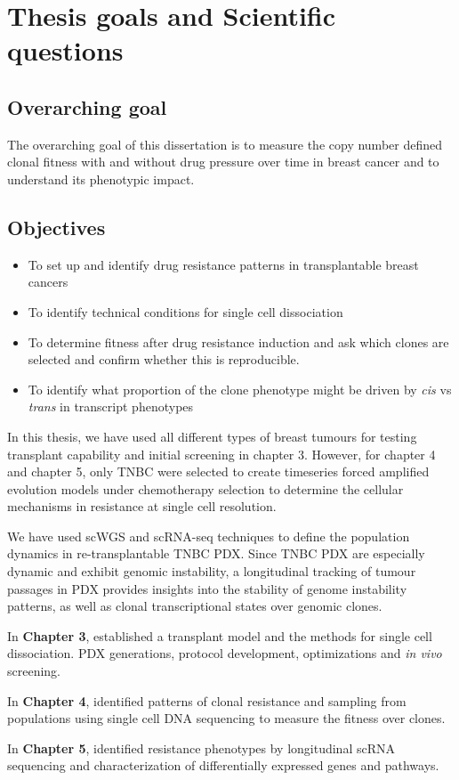 \section{Thesis goals and Scientific questions}

\subsection{Overarching goal}

The overarching goal of this dissertation is to measure the copy number defined clonal fitness with and without drug pressure over time in breast cancer and to understand its phenotypic impact.


\subsection{Objectives}
\begin{itemize}
\item{To set up and identify drug resistance patterns in transplantable breast cancers}

\item{To identify technical conditions for single cell dissociation}

\item{To determine fitness after drug resistance induction and ask which clones are selected and confirm whether this is reproducible}. 

\item{To identify what proportion of the clone phenotype might be driven by \textit{cis} vs \textit{trans} in transcript phenotypes} 

\end{itemize}

In this thesis, we have used all different types of breast tumours for testing transplant capability and initial screening in chapter 3.  However, for chapter 4 and chapter 5, only \ac{TNBC} were selected to create timeseries forced amplified evolution models under chemotherapy selection to determine the cellular mechanisms in resistance  at single cell resolution.

 We have used \ac{scWGS} and scRNA-seq techniques to define the population dynamics in re-transplantable TNBC PDX.
 Since TNBC PDX are especially dynamic and exhibit genomic instability, a longitudinal tracking of tumour passages in PDX provides insights into the stability of genome instability patterns, as well as clonal transcriptional states over genomic clones.
 
 In \textbf{Chapter 3}, established a transplant model and the methods for single cell dissociation. PDX generations, protocol development, optimizations and \textit{in vivo} screening. 
 
 In \textbf{Chapter 4}, identified patterns of clonal resistance and sampling from populations using single cell DNA sequencing to measure the fitness over clones.
 
 In \textbf{Chapter 5}, identified resistance phenotypes by longitudinal scRNA sequencing and characterization of differentially  expressed genes and pathways.

